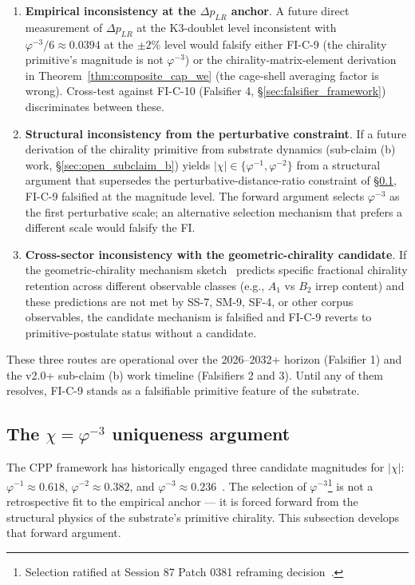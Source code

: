 \documentclass[11pt,letterpaper]{article}
\newcommand{\phig}{\varphi}
\newcommand{\DeltapLR}{\Delta p_{LR}}
\begin{document}
\begin{enumerate}\setlength\itemsep{0.2em}
    \item \textbf{Empirical inconsistency at the $\DeltapLR$ anchor}. A future direct measurement of $\DeltapLR$ at the K3-doublet level inconsistent with $\phig^{-3}/6 \approx 0.0394$ at the $\pm 2\%$ level would falsify either FI-C-9 (the chirality primitive's magnitude is not $\phig^{-3}$) or the chirality-matrix-element derivation in Theorem~\ref{thm:composite_cap_we} (the cage-shell averaging factor is wrong). Cross-test against FI-C-10 (Falsifier 4, \S\ref{sec:falsifier_framework}) discriminates between these.
    \item \textbf{Structural inconsistency from the perturbative constraint}. If a future derivation of the chirality primitive from substrate dynamics (sub-claim (b) work, \S\ref{sec:open_subclaim_b}) yields $|\chi| \in \{\phig^{-1}, \phig^{-2}\}$ from a structural argument that supersedes the perturbative-distance-ratio constraint of \S\ref{sec:chi_resolution}, FI-C-9 falsified at the magnitude level. The forward argument selects $\phig^{-3}$ as the first perturbative scale; an alternative selection mechanism that prefers a different scale would falsify the FI.
    \item \textbf{Cross-sector inconsistency with the geometric-chirality candidate}. If the geometric-chirality mechanism sketch~\cite{abshier_capotauro_chiral_mechanism_sketch} predicts specific fractional chirality retention across different observable classes (e.g., $A_1$ vs $B_2$ irrep content) and these predictions are not met by SS-7, SM-9, SF-4, or other corpus observables, the candidate mechanism is falsified and FI-C-9 reverts to primitive-postulate status without a candidate.
\end{enumerate}

These three routes are operational over the 2026--2032+ horizon (Falsifier 1) and the v2.0+ sub-claim (b) work timeline (Falsifiers 2 and 3). Until any of them resolves, FI-C-9 stands as a falsifiable primitive feature of the substrate.

\subsection{The $\chi = \phig^{-3}$ uniqueness argument}\label{sec:chi_resolution}

The CPP framework has historically engaged three candidate magnitudes for $|\chi|$: $\phig^{-1} \approx 0.618$, $\phig^{-2} \approx 0.382$, and $\phig^{-3} \approx 0.236$~\cite{abshier_capotauro_closure_sketch}. The selection of $\phig^{-3}$\footnote{Selection ratified at Session 87 Patch 0381 reframing decision~\cite{abshier_capotauro_closure_sketch}.} is not a retrospective fit to the empirical anchor --- it is forced forward from the structural physics of the substrate's primitive chirality. This subsection develops that forward argument.
\end{document}
